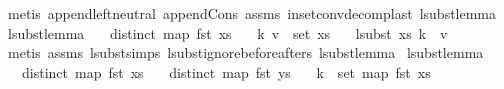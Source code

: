 \begin{isabellebody}
%
\isadelimproof
%
\endisadelimproof
%
\isatagproof
{}\isamarkupfalse%
\ {\isacharparenleft}{\kern0pt}metis\ append{\isachardot}{\kern0pt}left{\isacharunderscore}{\kern0pt}neutral\ append{\isacharunderscore}{\kern0pt}Cons\ assms{\isacharparenleft}{\kern0pt}{}{\isacharcomma}{\kern0pt}{}{\isacharparenright}{\kern0pt}\ in{\isacharunderscore}{\kern0pt}set{\isacharunderscore}{\kern0pt}conv{\isacharunderscore}{\kern0pt}decomp{\isacharunderscore}{\kern0pt}last\ lsubst{\isacharunderscore}{\kern0pt}lemma{}{\isacharparenleft}{\kern0pt}{}{\isacharcomma}{\kern0pt}{}{\isacharparenright}{\kern0pt}{\isacharparenright}{\kern0pt}%
\endisatagproof
{\isafoldproof}%
%
\isadelimproof
\isanewline
%
\endisadelimproof
\isanewline
\isanewline
{}\isamarkupfalse%
\ lsubst{\isacharunderscore}{\kern0pt}lemma{}{\isacharcolon}{\kern0pt}\isanewline
\ \ \ {\isachardoublequoteopen}distinct\ {\isacharparenleft}{\kern0pt}map\ fst\ xs{\isacharparenright}{\kern0pt}{\isachardoublequoteclose}\isanewline
\ \ \ {\isachardoublequoteopen}{\isacharparenleft}{\kern0pt}k{\isacharcomma}{\kern0pt}\ v{\isacharparenright}{\kern0pt}\ {\isasymin}\ set\ xs{\isachardoublequoteclose}\isanewline
\ \ \ {\isachardoublequoteopen}lsubst\ xs\ k\ {\isacharequal}{\kern0pt}\ v{\isachardoublequoteclose}\isanewline
%
\isadelimproof
%
\endisadelimproof
%
\isatagproof
{}\isamarkupfalse%
\ {\isacharparenleft}{\kern0pt}metis\ assms{\isacharparenleft}{\kern0pt}{}{\isacharcomma}{\kern0pt}{}{\isacharparenright}{\kern0pt}\ lsubst{\isachardot}{\kern0pt}simps{\isacharparenleft}{\kern0pt}{}{\isacharparenright}{\kern0pt}\ lsubst{\isacharunderscore}{\kern0pt}ignore{\isacharunderscore}{\kern0pt}beforeafters\ lsubst{\isacharunderscore}{\kern0pt}lemma{}{\isacharparenright}{\kern0pt}%
\endisatagproof
{\isafoldproof}%
%
\isadelimproof
\isanewline
%
\endisadelimproof
\isanewline
\isanewline
{}\isamarkupfalse%
\ lsubst{\isacharunderscore}{\kern0pt}lemma{}{\isacharcolon}{\kern0pt}\isanewline
\ \ \ {\isachardoublequoteopen}distinct\ {\isacharparenleft}{\kern0pt}map\ fst\ xs{\isacharparenright}{\kern0pt}{\isachardoublequoteclose}\isanewline
\ \ \ {\isachardoublequoteopen}distinct\ {\isacharparenleft}{\kern0pt}map\ fst\ ys{\isacharparenright}{\kern0pt}{\isachardoublequoteclose}\isanewline
\ \ \ {\isachardoublequoteopen}k\ {\isasymin}\ set\ {\isacharparenleft}{\kern0pt}map\ fst\ xs{\isacharparenright}{\kern0pt}{\isachardoublequoteclose}\isanewline

\end{isabellebody}

